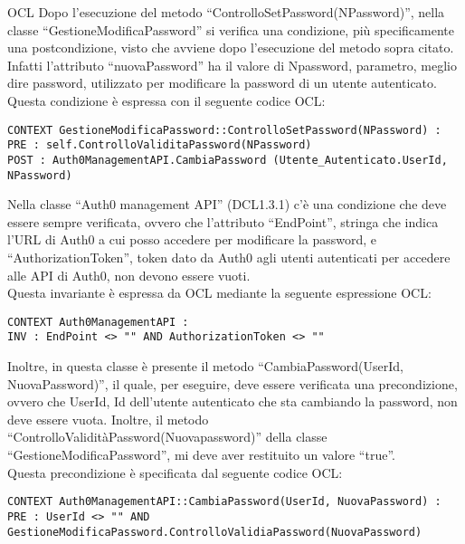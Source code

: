 \begin{listaPersonale}{OCL}
    Dopo l'esecuzione del metodo “ControlloSetPassword(NPassword)”, nella classe “GestioneModificaPassword” si verifica una condizione, più specificamente una postcondizione, visto che avviene dopo l'esecuzione del metodo sopra citato. Infatti l'attributo “nuovaPassword” ha il valore di Npassword, parametro, meglio dire password, utilizzato per modificare la password di un utente autenticato.\\
    Questa condizione è espressa con il seguente codice OCL:
    \begin{lstlisting}
CONTEXT GestioneModificaPassword::ControlloSetPassword(NPassword) :
PRE : self.ControlloValiditaPassword(NPassword)
POST : Auth0ManagementAPI.CambiaPassword (Utente_Autenticato.UserId, NPassword)
    \end{lstlisting}




    Nella classe “Auth0 management API” (DCL1.3.1) c'è una condizione che deve essere sempre verificata, ovvero che l'attributo “EndPoint”, stringa che indica l'URL di Auth0 a cui posso accedere per modificare la password, e “AuthorizationToken”, token dato da Auth0 agli utenti autenticati per accedere alle API di Auth0, non devono essere vuoti. \\
    Questa invariante è espressa da OCL mediante la seguente espressione OCL:
    \begin{lstlisting}
CONTEXT Auth0ManagementAPI :
INV : EndPoint <> "" AND AuthorizationToken <> ""
    \end{lstlisting}
    Inoltre, in questa classe è presente il metodo “CambiaPassword(UserId, NuovaPassword)”, il quale, per eseguire, deve essere verificata una precondizione, ovvero che UserId, Id dell'utente autenticato che sta cambiando la password, non deve essere vuota. Inoltre, il metodo “ControlloValiditàPassword(Nuovapassword)” della classe “GestioneModificaPassword”, mi deve aver restituito un valore “true”.\\ Questa precondizione è specificata dal seguente codice OCL:
    \begin{lstlisting}
CONTEXT Auth0ManagementAPI::CambiaPassword(UserId, NuovaPassword) :
PRE : UserId <> "" AND GestioneModificaPassword.ControlloValidiaPassword(NuovaPassword)
    \end{lstlisting}





\end{listaPersonale}
